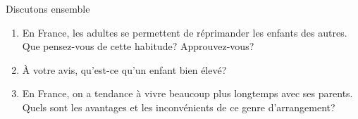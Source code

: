\begin{frame}{Discutons ensemble}
  \begin{enumerate}
    \item En France, les adultes se permettent de réprimander les enfants des autres. Que pensez-vous de cette habitude? Approuvez-vous?
    \item<2-> À votre avis, qu'est-ce qu'un enfant bien élevé?
    \item<3-> En France, on a tendance à vivre beaucoup plus longtemps avec ses parents. Quels sont les avantages et les inconvénients de ce genre d'arrangement?
  \end{enumerate}
\end{frame}